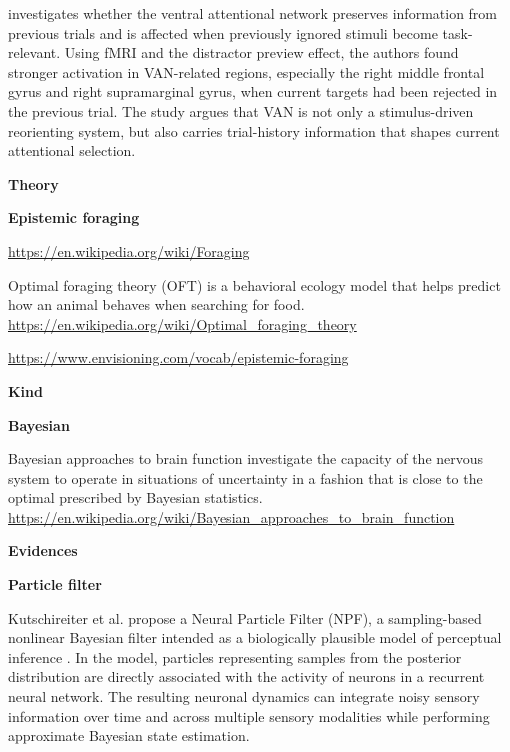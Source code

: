 \documentclass{book}
\providecommand{\ProjectDeepHeading}[2]{%
    \par\medskip\noindent\textbf{#2}\par\smallskip
}
\begin{document}

\cite{scalf-2014-trial-history-effects-in-the-ventral-attentional-network}  investigates whether the ventral attentional network preserves information from previous trials and is affected when previously ignored stimuli become task-relevant. Using fMRI and the distractor preview effect, the authors found stronger activation in VAN-related regions, especially the right middle frontal gyrus and right supramarginal gyrus, when current targets had been rejected in the previous trial. The study argues that VAN is not only a stimulus-driven reorienting system, but also carries trial-history information that shapes current attentional selection.

\ProjectDeepHeading{4}{Theory}

\ProjectDeepHeading{5}{Epistemic foraging}


\url{https://en.wikipedia.org/wiki/Foraging}
    
    Optimal foraging theory (OFT) is a behavioral ecology model that helps predict how an animal behaves when searching for food.
    \url{https://en.wikipedia.org/wiki/Optimal_foraging_theory}
    
    \url{https://www.envisioning.com/vocab/epistemic-foraging}

\ProjectDeepHeading{5}{Kind}


%

\ProjectDeepHeading{6}{Bayesian}


Bayesian approaches to brain function investigate the capacity of the nervous system to operate in situations of uncertainty in a fashion that is close to the optimal prescribed by Bayesian statistics. \url{https://en.wikipedia.org/wiki/Bayesian_approaches_to_brain_function}
   \ProjectDeepHeading{9}{Evidences}
      \ProjectDeepHeading{10}{Particle filter}
         Kutschireiter et al. propose a Neural Particle Filter (NPF), a sampling-based nonlinear Bayesian filter intended as a biologically plausible model of perceptual inference \cite{kutschireiter-2017-nonlinear-bayesian-filtering-and-learning-a-neuronal-dynamics-for-perception}.
         In the model, particles representing samples from the posterior distribution are directly associated with the activity of neurons in a recurrent neural network.
         The resulting neuronal dynamics can integrate noisy sensory information over time and across multiple sensory modalities while performing approximate Bayesian state estimation.
\end{document}
